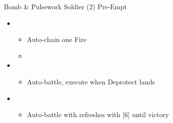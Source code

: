 \begin{paracol}{2}
\begin{battle}{Bomb \& Pulsework Soldier (2) Pre-Empt}
\begin{itemize}
			      \begin{itemize}
				      \item Auto-battle Pulsework Soldier, Bomb should die by Vanille.
				      \item If interrupted throw some autos on the Bomb, and then use [3] to get stagger time.
			      \end{itemize}
			\item \fifth
			      \begin{itemize}
				      \item Auto-chain one Fire
				      \item \stagger
			      \end{itemize}
			\item \third
			      \begin{itemize}
				      \item Auto-battle, execute when Deprotect lands
			      \end{itemize}
			\item \first
			      \begin{itemize}
				      \item Auto-battle with refreshes with [6] until victory
			      \end{itemize}
		\end{itemize}
	\end{battle}
	\switchcolumn*


\end{paracol}
